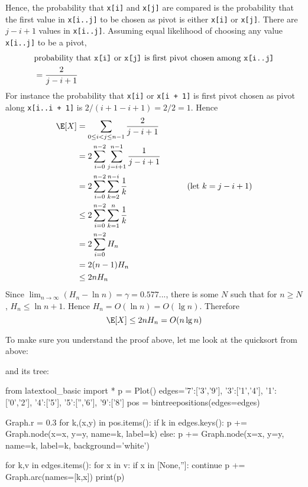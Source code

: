 Hence, the probability that \verb!x[i]!
and \verb!x[j]! are compared is the probability
that
the first value in
\verb!x[i..j]! to be chosen as pivot is either \verb!x[i]! or \verb!x[j]!.
There are $j - i + 1$ values in \verb!x[i..j]!.
Assuming equal likelihood of choosing any value
\verb!x[i..j]! to be a pivot,
\begin{align*}
  &\text{probability that \texttt{x[i]} or \texttt{x[j]} is first pivot chosen among \texttt{x[i..j]}}
  \\
  &= \frac{2}{j - i + 1}
\end{align*}
For instance the probability
that \verb!x[i]! or \verb!x[i + 1]!
is first pivot
chosen as pivot along 
\verb!x[i..i + 1]!
is $2/(i + 1 - i + 1) = 2/2 = 1$.
Hence
\begin{align*}
  \E[X]
  &= \sum_{0 \leq i < j \leq n - 1} \frac{2}{j - i + 1}
    \\
  &= 2 \sum_{i = 0}^{n - 2} \sum_{j = i + 1}^{n - 1} \frac{1}{j - i + 1}
    \\
  &= 2 \sum_{i = 0}^{n - 2} \sum_{k = 2}^{n - i} \frac{1}{k} \hspace{1in} \text{(let $k = j - i + 1$)}
    \\
  &\leq 2 \sum_{i = 0}^{n - 2} \sum_{k = 1}^{n} \frac{1}{k}
    \\
  &= 2 \sum_{i = 0}^{n - 2} H_n
    \\
  &= 2 (n - 1) H_n
    \\
  &\leq 2 n H_n
\end{align*}
Since
$\lim_{n \rightarrow \infty} (H_n - \ln n)
= \gamma = 0.577...$,
there is some $N$ such that for $n \geq N$, $H_n \leq \ln n + 1$.
Hence
$H_n = O(\ln n) = O(\lg n)$.
Therefore
\[
\E[X] \leq 2n H_n = O(n \lg n)
\]

To make sure you understand the proof above,
let me look at the quicksort from above:

and its tree:
\begin{python}
from latextool_basic import *
p = Plot()
edges={'7':['3','9'],
 '3':['1','4'],
 '1':['0','2'],
 '4':['5'],
 '5':['','6'],
 '9':['8']}
pos = bintreepositions(edges=edges)

Graph.r = 0.3
for k,(x,y) in pos.items():
    if k in edges.keys():
        p += Graph.node(x=x, y=y, name=k, label=k)
    else:
        p += Graph.node(x=x, y=y, name=k, label=k, background='white')

for k,v in edges.items():
    for x in v:
        if x in [None,'']: continue
        p += Graph.arc(names=[k,x])
print(p)
\end{python}    

